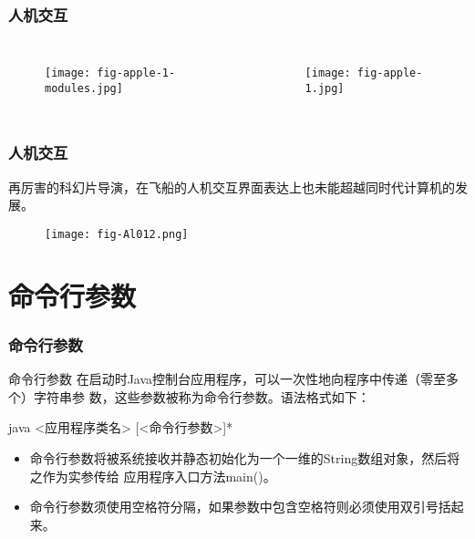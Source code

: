 \begin{frame}
  \frametitle{人机交互}

  
  \begin{columns}

    \begin{figure}
      \centering
      \texttt{[image: fig-apple-1-modules.jpg]}
    \end{figure}
    
    \begin{figure}
      \centering
      \texttt{[image: fig-apple-1.jpg]}
    \end{figure}
  \end{columns}

\end{frame}

\begin{frame}
  \frametitle{人机交互}

  {\hei 再厉害的科幻片导演，在飞船的人机交互界面表达上也未能超越同时代计算机的发展。}
  

  \begin{figure}
    \centering
    \texttt{[image: fig-Al012.png]}
  \end{figure}

\end{frame}


\section{命令行参数}

\begin{frame}[fragile] %
\frametitle{命令行参数}

\begin{block}{命令行参数}
  在启动时Java控制台应用程序，可以一次性地向程序中传递（零至多个）字符串参
  数，这些参数被称为命令行参数。语法格式如下：

  \begin{shCode}
    java <应用程序类名> [<命令行参数>]*
  \end{shCode}
\end{block}

\pause


\begin{itemize}\kai
\item 命令行参数将被系统接收并静态初始化为一个一维的String数组对象，然后将之作为实参传给
  应用程序入口方法main()。
\item 命令行参数须使用空格符分隔，如果参数中包含空格符则必须使用双引号括起来。
\end{itemize}
\end{frame}

